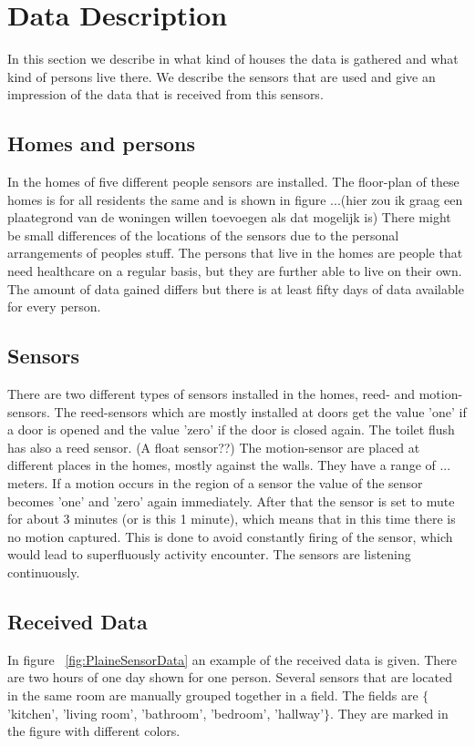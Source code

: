 \documentclass[11pt,a4paper]{article}
\begin{document}
\section{Data Description}
\label{sec:DataDesc}
In this section we describe in what kind of houses the data is gathered and what kind of persons live there. We describe the sensors that are used and give an impression of the data that is received from this sensors.
\subsection{Homes and persons}
In the homes of five different people sensors are installed. The floor-plan of these homes is for all residents the same and is shown in figure ...(hier zou ik graag een plaategrond van de woningen willen toevoegen als dat mogelijk is) There might be small differences of the locations of the sensors due to the personal arrangements of peoples stuff.
The persons that live in the homes are people that need healthcare on a regular basis, but they are further able to live on their own. The amount of data gained differs but there is at least fifty days of data available for every person. 
\subsection{Sensors}
There are two different types of sensors installed in the homes, reed- and motion-sensors. The reed-sensors which are mostly installed at doors get the value 'one' if a door is opened and the value 'zero' if the door is closed again. The toilet flush has also a reed sensor. (A float sensor??)
The motion-sensor are placed at different places in the homes, mostly against the walls. They have a range of ... meters. If a motion occurs in the region of a sensor the value of the sensor becomes 'one' and 'zero' again immediately. After that the sensor is set to mute for about 3 minutes (or is this 1 minute), which means that in this time there is no motion captured. This is done to avoid constantly firing of the sensor, which would lead to superfluously activity encounter.
The sensors are listening continuously.

\subsection{Received Data}
In figure ~\ref{fig:PlaineSensorData} an example of the received data is given. There are two hours of one day shown for one person. Several sensors that are located in the same room are manually grouped together in a field. The fields are $\{$'kitchen', 'living room', 'bathroom', 'bedroom', 'hallway'$\}$. They are marked in the figure with different colors.
\end{document}

